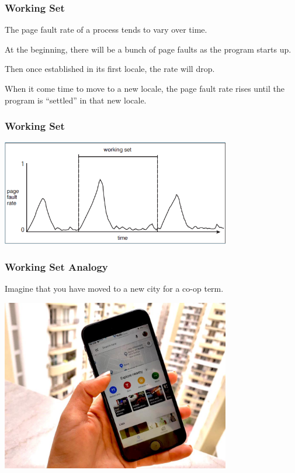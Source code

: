 \begin{frame}
\frametitle{Working Set}

The page fault rate of a process tends to vary over time. 

At the beginning, there will be a bunch of page faults as the program starts up. 

Then once established in its first locale, the rate will drop. 

When it come time to move to a new locale, the page fault rate rises until the program is ``settled'' in that new locale.


\end{frame}

\begin{frame}
\frametitle{Working Set}

\begin{center}
	\includegraphics[width=0.75\textwidth]{images/workingset.png}
\end{center}


\end{frame}

\begin{frame}
\frametitle{Working Set Analogy}

Imagine that you have moved to a new city for a co-op term. 

\begin{center}
	\includegraphics[width=0.75\textwidth]{images/explorenearby.jpg}
\end{center}

\end{frame}

